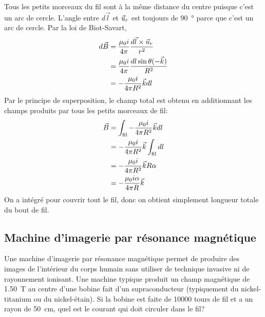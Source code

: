 Tous les petits morceaux du fil sont à la même distance du centre puisque c'est
un arc de cercle. L'angle entre $d\vec{l}$ et $\vec{u}_r$ est toujours de
\SI{90}{\degree} parce que c'est un arc de cercle. Par la loi de Biot-Savart,
\begin{align*}
  d\vec{B} &= \frac{\mu_0 i}{4\pi} \frac{d\vec{l} \times \vec{u}_r}{r^2} \\
       &= \frac{\mu_0 i}{4\pi} \frac{dl \sin\theta (-\vec{k})}{R^2} \\
       &= -\frac{\mu_0 i}{4\pi R^2} \vec{k} dl
\end{align*}
Par le principe de superposition, le champ total est obtenu en additionnant
les champs produits par tous les petits morceaux de fil:
\begin{align*}
  \vec{B} &= \int_\mathrm{fil} -\frac{\mu_0 i}{4\pi R^2}\vec{k} dl  \\
      &= -\frac{\mu_0 i}{4\pi R^2}\vec{k} \int_\mathrm{fil} dl  \\
      &= -\frac{\mu_0 i}{4\pi R^2}\vec{k} R\alpha  \\
      &= -\frac{\mu_0 i \alpha}{4\pi R}\vec{k}
\end{align*}
On a intégré pour couvrir tout le fil, donc on obtient simplement longueur
totale du bout de fil.


\begin{diapobox}
  \subsection*{Machine d'imagerie par résonance magnétique}

  Une machine d'imagerie par résonance magnétique permet de produire des images
  de l'intérieur du corps humain sans utiliser de technique invasive ni de
  rayonnement ionisant. Une machine typique produit un champ magnétique de
  \SI{1.50}{\tesla} au centre d'une bobine fait d'un supraconducteur
  (typiquement du nickel-titanium ou du nickel-étain). Si la bobine est faite
  de \num{10000} tours de fil et a un rayon de \SI{50}{\centi\meter}, quel est
  le courant qui doit circuler dans le fil?
\end{diapobox}

